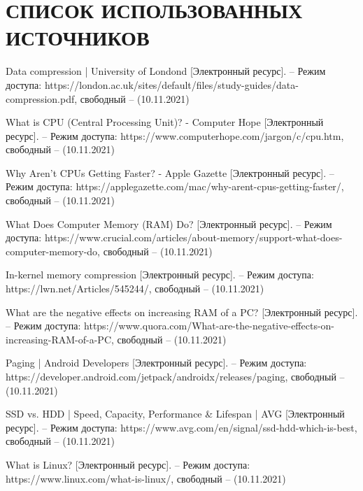 \section*{СПИСОК ИСПОЛЬЗОВАННЫХ ИСТОЧНИКОВ}

\begingroup
\renewcommand{\section}[2]{}
\begin{thebibliography}{}
	Data compression | University of Londond [Электронный ресурс]. – Режим доступа: https://london.ac.uk/sites/default/files/study-guides/data-compression.pdf,
	свободный – (10.11.2021)
	
	What is CPU (Central Processing Unit)? - Computer Hope [Электронный ресурс]. – Режим доступа: https://www.computerhope.com/jargon/c/cpu.htm,
	свободный – (10.11.2021)
	
	Why Aren’t CPUs Getting Faster? - Apple Gazette [Электронный ресурс]. – Режим доступа: https://applegazette.com/mac/why-arent-cpus-getting-faster/,
	свободный – (10.11.2021)
	
	What Does Computer Memory (RAM) Do? [Электронный ресурс]. – Режим доступа: https://www.crucial.com/articles/about-memory/support-what-does-computer-memory-do,
	свободный – (10.11.2021)
	
	In-kernel memory compression [Электронный ресурс]. – Режим доступа: https://lwn.net/Articles/545244/, свободный – (10.11.2021)
	
	What are the negative effects on increasing RAM of a PC? [Электронный ресурс]. – Режим доступа: https://www.quora.com/What-are-the-negative-effects-on-increasing-RAM-of-a-PC, свободный – (10.11.2021)
	
	Paging | Android Developers [Электронный ресурс]. – Режим доступа: https://developer.android.com/jetpack/androidx/releases/paging, свободный – (10.11.2021)
	
	 SSD vs. HDD | Speed, Capacity, Performance \& Lifespan | AVG [Электронный ресурс]. – Режим доступа: https://www.avg.com/en/signal/ssd-hdd-which-is-best, свободный – (10.11.2021)
	 
	 What is Linux? [Электронный ресурс]. – Режим доступа: https://www.linux.com/what-is-linux/, свободный – (10.11.2021)
	

\end{thebibliography}
